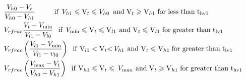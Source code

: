 \documentclass[journal]{IEEEtran}
\begin{document}
\begin{figure}[!t]
\begin{eqnarray}
\begin{aligned}
		&\frac{{{V_{h0}} - {V_t}}}{{{V_{h0}} - {V_{h1}}}}{\kern 1pt} {\kern 1pt} {\kern 1pt} {\kern 1pt} {\kern 1pt} {\kern 1pt} {\kern 1pt} {\kern 1pt} {\kern 1pt} {\kern 1pt} {\kern 1pt} {\kern 1pt} {\kern 1pt} {\kern 1pt} {\kern 1pt} {\kern 1pt} {\kern 1pt} {\kern 1pt} {\kern 1pt} {\kern 1pt} {\kern 1pt} {\kern 1pt} {\kern 1pt} {\kern 1pt} {\kern 1pt} {\kern 1pt} {\kern 1pt} {\rm{if}}{\kern 1pt} {\kern 1pt} {\kern 1pt} {\kern 1pt} {V_{h1}} \leqslant {{\rm{V}}_t} \leqslant {V_{h0}}{\kern 1pt} {\kern 1pt} {\kern 1pt} {\kern 1pt} {\kern 1pt} {\rm{and}}{\kern 1pt} {\kern 1pt} {\kern 1pt}  {{\rm{V}}_t} \geqslant {{\rm{V}}_{h1}} {\kern 1pt}{\kern 1pt}{\kern 1pt}\rm{for} {\kern 1pt}{\kern 1pt}{\kern 1pt}\rm{less}{\kern 1pt}{\kern 1pt}{\kern 1pt}\rm{than}{\kern 1pt}{\kern 1pt} {\kern 1pt}{{\rm{t}}_{hv1}} \\ 
		&{V_{rfrac}}\frac{{{V_t} - {V_{\min }}}}{{{V_{l1}} - {V_{l0}}}}{\kern 1pt} {\kern 1pt} {\kern 1pt} {\kern 1pt} {\kern 1pt} {\kern 1pt} {\kern 1pt} {\rm{if}}{\kern 1pt} {\kern 1pt} {\kern 1pt} {\kern 1pt} {V_{\min }} \leqslant {{\rm{V}}_t} \leqslant {{\rm{V}}_{l1}}{\kern 1pt} {\kern 1pt} {\kern 1pt} {\kern 1pt} {\rm{and}}{\kern 1pt} {\kern 1pt} {\kern 1pt}  {{\rm{V}}_t} \leqslant {{\rm{V}}_{l1}} {\kern 1pt}{\kern 1pt}{\kern 1pt}\rm{for} {\kern 1pt}{\kern 1pt}{\kern 1pt}\rm{greater}{\kern 1pt}{\kern 1pt}{\kern 1pt}\rm{than}{\kern 1pt}{\kern 1pt} {\kern 1pt}{{\rm{t}}_{lv1}}\\ 
		&{V_{rfrac}}\left( {\frac{{{V_{l1}} - {V_{\min }}}}{{{V_{l1}} - {v_{l0}}}}} \right){\kern 1pt} {\kern 1pt} {\kern 1pt} {\kern 1pt} {\kern 1pt} {\kern 1pt} {\rm{if}}{\kern 1pt} {\kern 1pt} {\kern 1pt} {{\rm{V}}_{l1}} < {{\rm{V}}_t}{\rm{ < }}{\kern 1pt} {\kern 1pt} {V_{h1}}{\kern 1pt} {\kern 1pt} {\kern 1pt} {\kern 1pt} {\rm{and}}{\kern 1pt} {\kern 1pt} {\kern 1pt}  {{\rm{V}}_t} \leqslant {{\rm{V}}_{h1}} {\kern 1pt}{\kern 1pt}{\kern 1pt}\rm{for} {\kern 1pt}{\kern 1pt}{\kern 1pt}\rm{greater}{\kern 1pt}{\kern 1pt}{\kern 1pt}\rm{than}{\kern 1pt}{\kern 1pt} {\kern 1pt}{{\rm{t}}_{lv1}}\\ 
		&{V_{rfrac}}\left( {\frac{{{V_{\max }} - {V_t}}}{{{V_{h0}} - {V_{h1}}}}} \right){\kern 1pt} {\kern 1pt} {\kern 1pt} {\kern 1pt} {\kern 1pt} {\kern 1pt} {\rm{if}}{\kern 1pt} {\kern 1pt} {\kern 1pt} {{\rm{V}}_{h1}} \leqslant {{\rm{V}}_t} \leqslant {\kern 1pt} {\kern 1pt} {V_{\max }}{\kern 1pt} {\kern 1pt} {\kern 1pt} {\kern 1pt} {\rm{and}}{\kern 1pt} {\kern 1pt} {\kern 1pt}  {{\rm{V}}_t} \geqslant {{\rm{V}}_{h1}} {\kern 1pt}{\kern 1pt}{\kern 1pt}\rm{for} {\kern 1pt}{\kern 1pt}{\kern 1pt}\rm{greater}{\kern 1pt}{\kern 1pt}{\kern 1pt}\rm{than}{\kern 1pt}{\kern 1pt} {\kern 1pt}{{\rm{t}}_{hv1}}\\ 

\end{aligned}
\end{eqnarray}
\end{figure}
\end{document}
